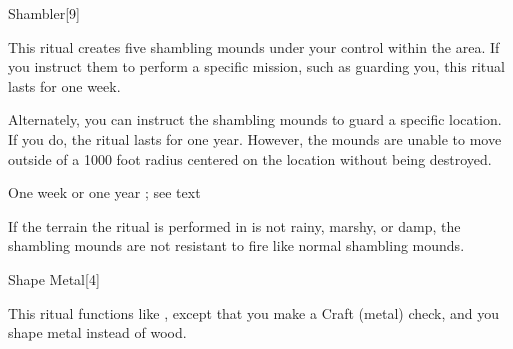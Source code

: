 \begin{spellsection}{Shambler}[9]
    \begin{spellheader}
    \end{spellheader}
    \begin{spellcontent}
        \begin{spelltargetinginfo}
        \end{spelltargetinginfo}
        \begin{spelleffects}

            \spellline
            \spelleffect This ritual creates five shambling mounds under your control within the area. If you instruct them to perform a specific mission, such as guarding you, this ritual lasts for one week.

            Alternately, you can instruct the shambling mounds to guard a specific location. If you do, the ritual lasts for one year. However, the mounds are unable to move outside of a 1000 foot radius centered on the location without being destroyed.

            \spelldur One week or one year \dismissable; see text
        \end{spelleffects}
    \end{spellcontent}
    \begin{spellfooter}
        \spellnotes If the terrain the ritual is performed in is not rainy, marshy, or damp, the shambling mounds are not resistant to fire like normal shambling mounds.
    \end{spellfooter}
\end{spellsection}

\begin{spellsection}{Shape Metal}[4]
    \begin{spellheader}
    \end{spellheader}
    \begin{spellcontent}
        \begin{spelltargetinginfo}
        \end{spelltargetinginfo}
        \begin{spelleffects}

            \spellspecial This ritual functions like , except that you make a Craft (metal) check, and you shape metal instead of wood. 
        \end{spelleffects}
    \end{spellcontent}
    \begin{spellfooter}
    \end{spellfooter}
\end{spellsection}

